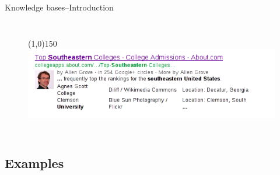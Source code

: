 \documentclass[onlymath,xcolor=pdftex,dvipsnames,table]{beamer}
\begin{document}
\begin{frame}{Knowledge bases--Introduction}
\begin{columns}[c]
\begin{figure}
    \line(1,0){150}\\
    \includegraphics[width=\linewidth]{eg3.png}
  \end{figure}
\end{columns}
\end{frame}


\subsection{Examples}
\end{document}
